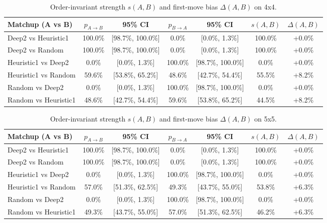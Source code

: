 \begin{table}
\caption{Order-invariant strength $s(A,B)$ and first-move bias $\Delta(A,B)$ on 4x4.}
\label{tab:order_summary_4x4}
\begin{tabular}{lcccccc}
\toprule
Matchup (A vs B) & $p_{A\to B}$ & 95\% CI & $p_{B\to A}$ & 95\% CI & $s(A,B)$ & $\Delta(A,B)$ \\
\midrule
Deep2 vs Heuristic1 & 100.0\% & [98.7\%, 100.0\%] & 0.0\% & [0.0\%, 1.3\%] & 100.0\% & +0.0\% \\
Deep2 vs Random & 100.0\% & [98.7\%, 100.0\%] & 0.0\% & [0.0\%, 1.3\%] & 100.0\% & +0.0\% \\
Heuristic1 vs Deep2 & 0.0\% & [0.0\%, 1.3\%] & 100.0\% & [98.7\%, 100.0\%] & 0.0\% & +0.0\% \\
Heuristic1 vs Random & 59.6\% & [53.8\%, 65.2\%] & 48.6\% & [42.7\%, 54.4\%] & 55.5\% & +8.2\% \\
Random vs Deep2 & 0.0\% & [0.0\%, 1.3\%] & 100.0\% & [98.7\%, 100.0\%] & 0.0\% & +0.0\% \\
Random vs Heuristic1 & 48.6\% & [42.7\%, 54.4\%] & 59.6\% & [53.8\%, 65.2\%] & 44.5\% & +8.2\% \\
\bottomrule
\end{tabular}
\end{table}


\begin{table}
\caption{Order-invariant strength $s(A,B)$ and first-move bias $\Delta(A,B)$ on 5x5.}
\label{tab:order_summary_5x5}
\begin{tabular}{lcccccc}
\toprule
Matchup (A vs B) & $p_{A\to B}$ & 95\% CI & $p_{B\to A}$ & 95\% CI & $s(A,B)$ & $\Delta(A,B)$ \\
\midrule
Deep2 vs Heuristic1 & 100.0\% & [98.7\%, 100.0\%] & 0.0\% & [0.0\%, 1.3\%] & 100.0\% & +0.0\% \\
Deep2 vs Random & 100.0\% & [98.7\%, 100.0\%] & 0.0\% & [0.0\%, 1.3\%] & 100.0\% & +0.0\% \\
Heuristic1 vs Deep2 & 0.0\% & [0.0\%, 1.3\%] & 100.0\% & [98.7\%, 100.0\%] & 0.0\% & +0.0\% \\
Heuristic1 vs Random & 57.0\% & [51.3\%, 62.5\%] & 49.3\% & [43.7\%, 55.0\%] & 53.8\% & +6.3\% \\
Random vs Deep2 & 0.0\% & [0.0\%, 1.3\%] & 100.0\% & [98.7\%, 100.0\%] & 0.0\% & +0.0\% \\
Random vs Heuristic1 & 49.3\% & [43.7\%, 55.0\%] & 57.0\% & [51.3\%, 62.5\%] & 46.2\% & +6.3\% \\
\bottomrule
\end{tabular}
\end{table}



